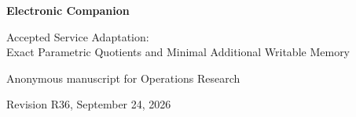 \documentclass[11pt,letterpaper]{article}
\theoremstyle{definition}\newtheorem{assumption}[theorem]{Assumption}
\begin{document}
\begin{center}{\Large\bfseries Electronic Companion}\par\medskip
{\large Accepted Service Adaptation:\\ Exact Parametric Quotients and Minimal Additional Writable Memory}\par\medskip
Anonymous manuscript for Operations Research\par
Revision R36, September 24, 2026
\end{center}











\end{document}
